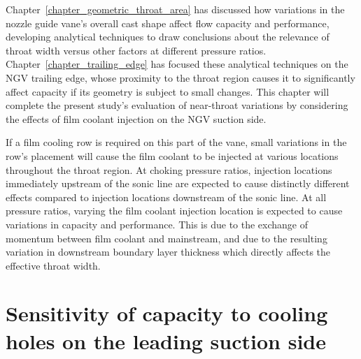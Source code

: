 \documentclass[a4paper, 11pt, oneside]{report}
\begin{document}

Chapter~\ref{chapter_geometric_throat_area} has discussed how variations in the nozzle guide vane's overall cast shape affect flow capacity and performance, developing analytical techniques to draw conclusions about the relevance of throat width versus other factors at different pressure ratios. Chapter~\ref{chapter_trailing_edge} has focused these analytical techniques on the NGV trailing edge, whose proximity to the throat region causes it to significantly affect capacity if its geometry is subject to small changes. This chapter will complete the present study's evaluation of near-throat variations by considering the effects of film coolant injection on the NGV suction side. 

If a film cooling row is required on this part of the vane, small variations in the row's placement will cause the film coolant to be injected at various locations throughout the throat region. At choking pressure ratios, injection locations immediately upstream of the sonic line are expected to cause distinctly different effects compared to injection locations downstream of the sonic line. At all pressure ratios, varying the film coolant injection location is expected to cause variations in capacity and performance. This is due to the exchange of momentum between film coolant and mainstream, and due to the resulting variation in downstream boundary layer thickness which directly affects the effective throat width.


\section{Sensitivity of capacity to cooling holes on the leading suction side}

\end{document}
